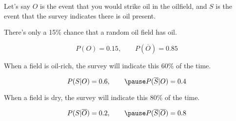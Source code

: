 \documentclass{beamer}\usepackage[]{graphicx}\usepackage[]{color}
\begin{document}
\begin{darkframes}
    \begin{frame}
      Let's say $O$ is the event that you would strike oil in the oilfield, and $S$ is the event that the survey indicates there is oil present.

      \bigskip\pause

      There's only a 15\% chance that a random oil field has oil.

      \[  P(O) = 0.15, \qquad P(\overline O) = 0.85 \]

      \bigskip\pause

      When a field is oil-rich, the survey will indicate this 60\% of the time.

      \pause

      \[ P(S|O) = 0.6, \qquad\pause P(\overline S|O) = 0.4 \]

      \pause

      When a field is dry, the survey will indicate this 80\% of the time.

      \pause

      \[ P(S|\overline O) = 0.2, \qquad\pause P(\overline S|\overline O) = 0.8 \]
    \end{frame}


\end{darkframes}
\end{document}
